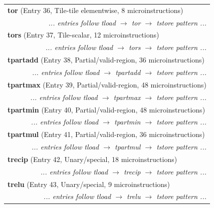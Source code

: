 \begin{longtable}{r r r r r r r r}
\multicolumn{8}{l}{\textbf{tor} (Entry 36, Tile-tile elementwise, 8 microinstructions)} \\
  & \multicolumn{7}{r}{\textit{... entries follow tload $\rightarrow$ tor $\rightarrow$ tstore pattern ...}} \\

\multicolumn{8}{l}{\textbf{tors} (Entry 37, Tile-scalar, 12 microinstructions)} \\
  & \multicolumn{7}{r}{\textit{... entries follow tload $\rightarrow$ tors $\rightarrow$ tstore pattern ...}} \\

\multicolumn{8}{l}{\textbf{tpartadd} (Entry 38, Partial/valid-region, 36 microinstructions)} \\
  & \multicolumn{7}{r}{\textit{... entries follow tload $\rightarrow$ tpartadd $\rightarrow$ tstore pattern ...}} \\

\multicolumn{8}{l}{\textbf{tpartmax} (Entry 39, Partial/valid-region, 48 microinstructions)} \\
  & \multicolumn{7}{r}{\textit{... entries follow tload $\rightarrow$ tpartmax $\rightarrow$ tstore pattern ...}} \\

\multicolumn{8}{l}{\textbf{tpartmin} (Entry 40, Partial/valid-region, 48 microinstructions)} \\
  & \multicolumn{7}{r}{\textit{... entries follow tload $\rightarrow$ tpartmin $\rightarrow$ tstore pattern ...}} \\

\multicolumn{8}{l}{\textbf{tpartmul} (Entry 41, Partial/valid-region, 36 microinstructions)} \\
  & \multicolumn{7}{r}{\textit{... entries follow tload $\rightarrow$ tpartmul $\rightarrow$ tstore pattern ...}} \\

\multicolumn{8}{l}{\textbf{trecip} (Entry 42, Unary/special, 18 microinstructions)} \\
  & \multicolumn{7}{r}{\textit{... entries follow tload $\rightarrow$ trecip $\rightarrow$ tstore pattern ...}} \\

\multicolumn{8}{l}{\textbf{trelu} (Entry 43, Unary/special, 9 microinstructions)} \\
  & \multicolumn{7}{r}{\textit{... entries follow tload $\rightarrow$ trelu $\rightarrow$ tstore pattern ...}} \\


\end{longtable}
